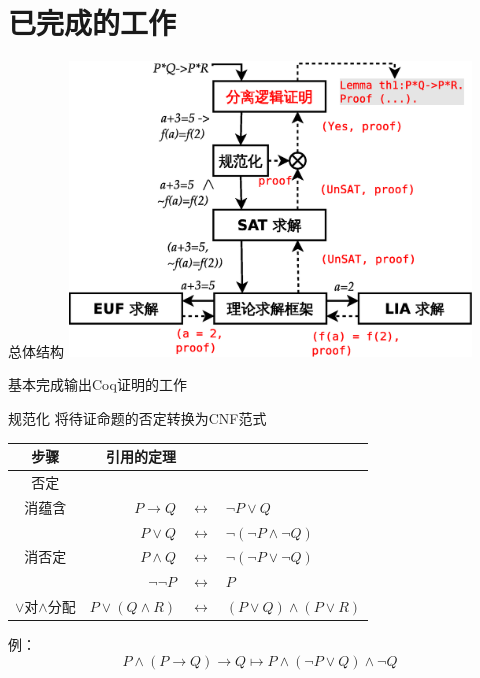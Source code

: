 \documentclass{beamer}
\begin{document}
\section{已完成的工作}
\begin{frame}[fragile]
  \begin{block}{总体结构}
    \includegraphics[width=0.8\textwidth]{stru.eps}
  \end{block}
  \begin{block}{}
    基本完成输出Coq证明的工作
  \end{block}
\end{frame}

\begin{frame}[fragile]
  \begin{block}{规范化}
    将待证命题的否定转换为CNF范式
  \end{block}
  \begin{block}{}
    \begin{tabular}{c|rcl}
      步骤 & 引用的定理 & & \\
      \hline
      否定 & & &\\
      \hline
      消蕴含 & $P \rightarrow Q$ & $\leftrightarrow$ & $\lnot P \lor Q$  \\
      \hline
       & $P \lor Q$ & $\leftrightarrow$ & $\lnot ( \lnot P \land \lnot Q )$ \\
      消否定 & $ P \land Q$ & $\leftrightarrow$ & $\lnot ( \lnot P \lor \lnot Q )$ \\
      & $ \lnot \lnot P$ & $\leftrightarrow$ & $P$ \\
      \hline
      $\lor$对$\land$分配 & $ P \lor (Q \land R)$ & $\leftrightarrow$ & $(P \lor Q) \land (P \lor R)$ \\
    \end{tabular}
  \end{block}
  \begin{block}{}
    例：
    $$ P \land ( P \rightarrow Q ) \rightarrow Q \longmapsto P \land (\lnot P \lor Q) \land \lnot Q $$
  \end{block}
\end{frame}
\end{document}

